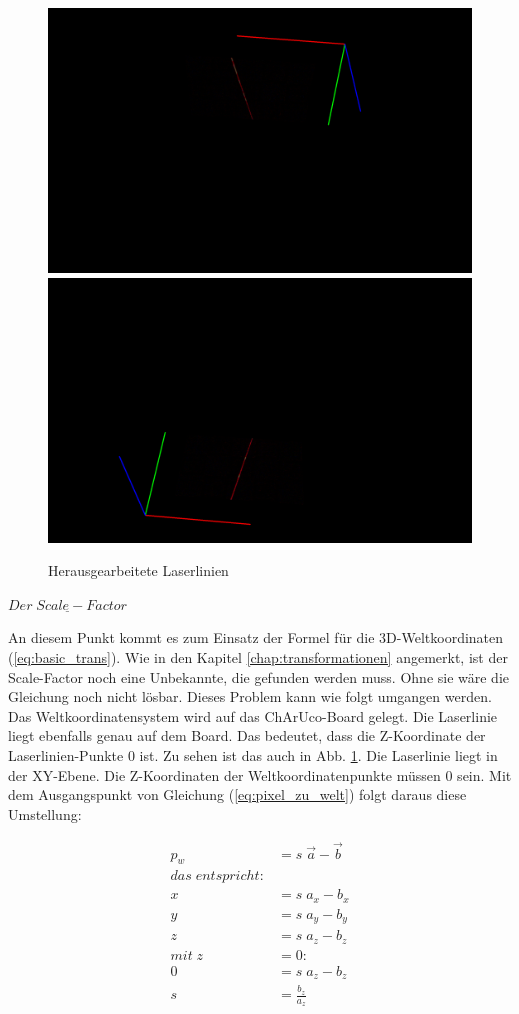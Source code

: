 		\begin{figure}[h]
			\centering
			\includegraphics[width=0.49\linewidth]{img/hauptteil/ext-calib/laserline_primary.png}
			\includegraphics[width=0.49\linewidth]{img/hauptteil/ext-calib/laserline_secondary.png}
			\caption{Herausgearbeitete Laserlinien}
			\label{fig:ext-calib-laserlines}
		\end{figure}
	
		$\underline{Der \; Scale-Factor}$
		
		An diesem Punkt kommt es zum Einsatz der Formel für die 3D-Weltkoordinaten (\ref{eq:basic_trans}). Wie in den Kapitel \ref{chap:transformationen} angemerkt, ist der Scale-Factor noch eine Unbekannte, die gefunden werden muss. Ohne sie wäre die Gleichung noch nicht lösbar. Dieses Problem kann wie folgt umgangen werden. Das Weltkoordinatensystem wird auf das ChArUco-Board gelegt. Die Laserlinie liegt ebenfalls genau auf dem Board. Das bedeutet, dass die Z-Koordinate der Laserlinien-Punkte 0 ist. Zu sehen ist das auch in Abb. \ref{fig:ext-calib-laserlines}. Die Laserlinie liegt in der XY-Ebene. Die Z-Koordinaten der Weltkoordinatenpunkte müssen 0 sein. Mit dem Ausgangspunkt von Gleichung (\ref{eq:pixel_zu_welt}) folgt daraus diese Umstellung:
		
		\begin{equation}
			\begin{aligned}
				p_w &= s \; \vec{a} - \vec{b} \\
				das \; entspricht: \\
				x &= s \; a_x - b_x \\
				y &= s \; a_y - b_y \\
				z &= s \; a_z - b_z \\
				mit \; z &= 0: \\
				0 &= s \; a_z - b_z \\
				s &= \frac{b_z}{a_z}
			\end{aligned}
		\end{equation}
		
